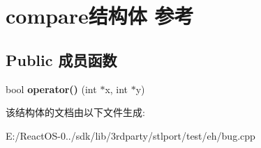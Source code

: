 \hypertarget{structcompare}{}\section{compare结构体 参考}
\label{structcompare}
\subsection*{Public 成员函数}
\begin{DoxyCompactItemize}
\item 
\mbox{\label{structcompare_aea593d15032876491460e30169b88fa4}} 
bool {\bfseries operator()} (int $\ast$x, int $\ast$y)
\end{DoxyCompactItemize}


该结构体的文档由以下文件生成\+:\begin{DoxyCompactItemize}
\item 
E\+:/\+React\+O\+S-\/0../sdk/lib/3rdparty/stlport/test/eh/bug.\+cpp\end{DoxyCompactItemize}

